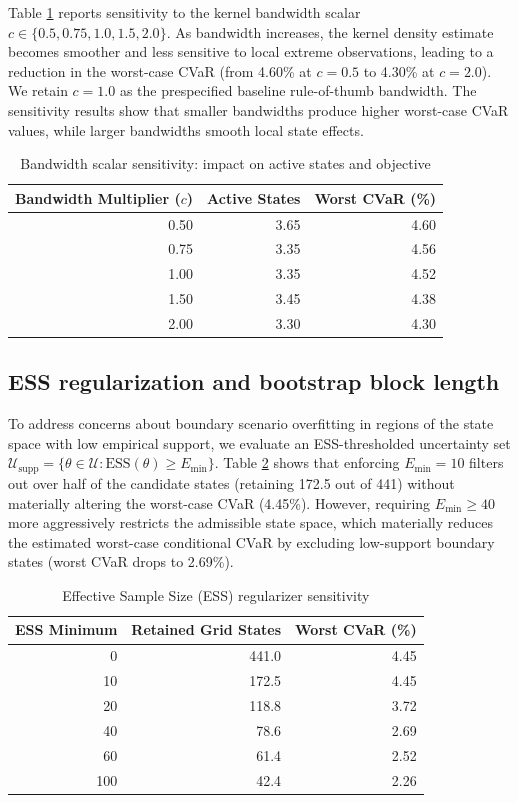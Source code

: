 \documentclass[11pt, a4paper]{article}
\begin{document}
Table \ref{tab:sens_bw} reports sensitivity to the kernel bandwidth scalar $c \in \{0.5, 0.75, 1.0, 1.5, 2.0\}$. As bandwidth increases, the kernel density estimate becomes smoother and less sensitive to local extreme observations, leading to a reduction in the worst-case CVaR (from 4.60\% at $c=0.5$ to 4.30\% at $c=2.0$). We retain $c=1.0$ as the prespecified baseline rule-of-thumb bandwidth. The sensitivity results show that smaller bandwidths produce higher worst-case CVaR values, while larger bandwidths smooth local state effects.

\begin{table}[htbp]
\centering
\caption{Bandwidth scalar sensitivity: impact on active states and objective}
\label{tab:sens_bw}
\begin{tabular}{rrr}
\toprule
\textbf{Bandwidth Multiplier ($c$)} & \textbf{Active States} & \textbf{Worst CVaR (\%)} \\
\midrule
0.50 & 3.65 & 4.60 \\
0.75 & 3.35 & 4.56 \\
1.00 & 3.35 & 4.52 \\
1.50 & 3.45 & 4.38 \\
2.00 & 3.30 & 4.30 \\
\bottomrule
\end{tabular}
\end{table}

\subsection{ESS regularization and bootstrap block length}
To address concerns about boundary scenario overfitting in regions of the state space with low empirical support, we evaluate an ESS-thresholded uncertainty set $\mathcal{U}_{\text{supp}} = \{\theta \in \mathcal{U} : \text{ESS}(\theta) \ge E_{\min}\}$. Table \ref{tab:sens_ess} shows that enforcing $E_{\min} = 10$ filters out over half of the candidate states (retaining 172.5 out of 441) without materially altering the worst-case CVaR (4.45\%). However, requiring $E_{\min} \ge 40$ more aggressively restricts the admissible state space, which materially reduces the estimated worst-case conditional CVaR by excluding low-support boundary states (worst CVaR drops to 2.69\%).

\begin{table}[htbp]
\centering
\caption{Effective Sample Size (ESS) regularizer sensitivity}
\label{tab:sens_ess}
\begin{tabular}{rrr}
\toprule
\textbf{ESS Minimum} & \textbf{Retained Grid States} & \textbf{Worst CVaR (\%)} \\
\midrule
0 & 441.0 & 4.45 \\
10 & 172.5 & 4.45 \\
20 & 118.8 & 3.72 \\
40 & 78.6 & 2.69 \\
60 & 61.4 & 2.52 \\
100 & 42.4 & 2.26 \\
\bottomrule
\end{tabular}
\end{table}
\end{document}
